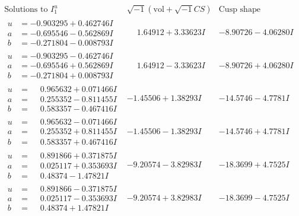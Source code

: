 \documentclass[1p]{elsarticle_modified}
\theoremstyle{definition}
\newcommand{\I}{\sqrt{-1}}
\begin{document}
$$\begin{array}{c|c|c}  
\text{Solutions to }I^u_{1}& \I (\text{vol} + \sqrt{-1}CS) & \text{Cusp shape}\\
 \hline 
\begin{aligned}
u &= -0.903295 + 0.462746 I \\
a &= -0.695546 - 0.562869 I \\
b &= -0.271804 - 0.008793 I\end{aligned}
 & \phantom{-}1.64912 + 3.33623 I & -8.90726 - 4.06280 I \\ \hline\begin{aligned}
u &= -0.903295 - 0.462746 I \\
a &= -0.695546 + 0.562869 I \\
b &= -0.271804 + 0.008793 I\end{aligned}
 & \phantom{-}1.64912 - 3.33623 I & -8.90726 + 4.06280 I \\ \hline\begin{aligned}
u &= \phantom{-}0.965632 + 0.071466 I \\
a &= \phantom{-}0.255352 - 0.811455 I \\
b &= \phantom{-}0.583357 - 0.467416 I\end{aligned}
 & -1.45506 + 1.38293 I & -14.5746 - 4.7781 I \\ \hline\begin{aligned}
u &= \phantom{-}0.965632 - 0.071466 I \\
a &= \phantom{-}0.255352 + 0.811455 I \\
b &= \phantom{-}0.583357 + 0.467416 I\end{aligned}
 & -1.45506 - 1.38293 I & -14.5746 + 4.7781 I \\ \hline\begin{aligned}
u &= \phantom{-}0.891866 + 0.371875 I \\
a &= \phantom{-}0.025117 + 0.353693 I \\
b &= \phantom{-}0.48374 - 1.47821 I\end{aligned}
 & -9.20574 - 3.82983 I & -18.3699 + 4.7525 I \\ \hline\begin{aligned}
u &= \phantom{-}0.891866 - 0.371875 I \\
a &= \phantom{-}0.025117 - 0.353693 I \\
b &= \phantom{-}0.48374 + 1.47821 I\end{aligned}
 & -9.20574 + 3.82983 I & -18.3699 - 4.7525 I \\ \hline\begin{aligned}

\end{aligned}
\end{array}$$
\end{document}
